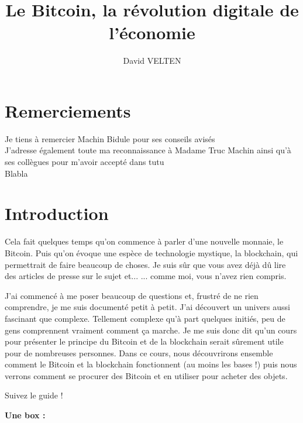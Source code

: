 \documentclass{bredele} %
\title{Le Bitcoin, la révolution digitale de l'économie}
\author{David VELTEN}
\begin{document}
    \maketitle

    \clearemptydoublepage
    \chapter*{Remerciements}
    \thispagestyle{empty}
    Je tiens à remercier Machin Bidule pour ses conseils avisés \\
    J'adresse également toute ma reconnaissance à Madame Truc Machin ainsi qu'à ses collègues pour m'avoir accepté dans tutu \\
    Blabla

    \frontmatter
    \chapter*{Introduction}

    Cela fait quelques temps qu'on commence à parler d'une nouvelle monnaie, le Bitcoin. Puis qu'on évoque une espèce de technologie mystique, la blockchain, qui permettrait de faire beaucoup de choses. Je suis sûr que vous avez déjà dû lire des articles de presse sur le sujet et...
    ... comme moi, vous n'avez rien compris.


    J'ai commencé à me poser beaucoup de questions et, frustré de ne rien comprendre, je me suis documenté petit à petit. J'ai découvert un univers aussi fascinant que complexe. Tellement complexe qu'à part quelques initiés, peu de gens comprennent vraiment comment ça marche. Je me suis donc dit qu'un cours pour présenter le principe du Bitcoin et de la blockchain serait sûrement utile pour de nombreuses personnes. Dans ce cours, nous découvrirons ensemble comment le Bitcoin et la blockchain fonctionnent (au moins les bases !) puis nous verrons comment se procurer des Bitcoin et en utiliser pour acheter des objets.

    Suivez le guide !

    \textbf{Une box : }

\end{document}
